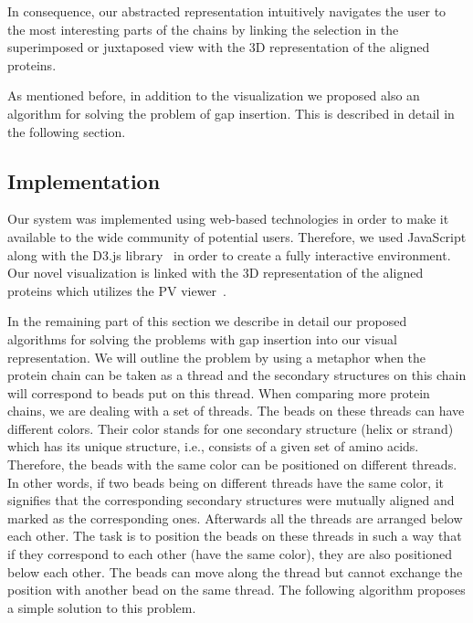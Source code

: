 \documentclass[twocolumn]{bmcart}%
\begin{document}
In consequence, our abstracted representation intuitively navigates the user to the most interesting parts of the chains by linking the selection in the superimposed or juxtaposed view with the 3D representation of the aligned proteins. 

As mentioned before, in addition to the visualization we proposed also an algorithm for solving the problem of gap insertion.
This is described in detail in the following section.


\subsection*{Implementation}
Our system was implemented using web-based technologies in order to make it available to the wide community of potential users.
Therefore, we used JavaScript along with the D3.js library~\cite{d3} in order to create a fully interactive environment.
Our novel visualization is linked with the 3D representation of the aligned proteins which utilizes the PV viewer~\cite{biasini2014}. 

In the remaining part of this section we describe in detail our proposed algorithms for solving the problems with gap insertion into our visual representation.
We will outline the problem by using a metaphor when the protein chain can be taken as a thread and the secondary structures on this chain will correspond to beads put on this thread.
When comparing more protein chains, we are dealing with a set of threads. 
The beads on these threads can have different colors. 
Their color stands for one secondary structure (helix or strand) which has its unique structure, i.e., consists of a given set of amino acids.
Therefore, the beads with the same color can be positioned on different threads.
In other words, if two beads being on different threads have the same color, it signifies that the corresponding secondary structures were mutually aligned and marked as the corresponding ones. 
Afterwards all the threads are arranged below each other.
The task is to position the beads on these threads in such a way that if they correspond to each other (have the same color), they are also positioned below each other. 
The beads can move along the thread but cannot exchange the position with another bead on the same thread.
The following algorithm proposes a simple solution to this problem.

\end{document}
